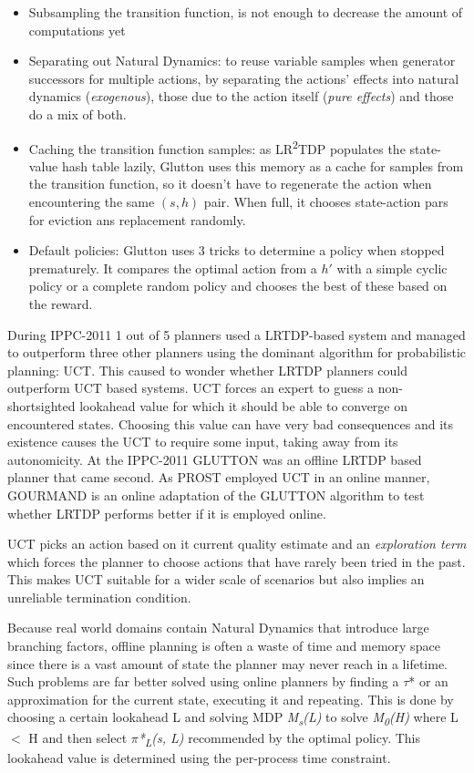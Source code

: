 \documentclass[runningheads,a4paper]{llncs}
\begin{document}
\begin{itemize}
	\item Subsampling the transition function, is not enough to decrease the amount of computations yet
	\item Separating out Natural Dynamics: to reuse variable samples when generator successors for multiple actions, by separating the actions' effects into natural dynamics (\emph{exogenous}), those due to the action itself (\emph{pure effects}) and those do a mix of both.
	\item Caching the transition function samples: as LR\textsuperscript{2}TDP populates the state-value hash table lazily, Glutton uses  this memory as a cache for samples from the transition function, so it doesn't have to regenerate the action when encountering the same $(s,h)$ pair. When full, it chooses state-action pars for eviction ans replacement randomly.
	\item Default policies: Glutton uses 3 tricks to determine a policy when stopped prematurely. It compares the optimal action from a $h'$ with a simple cyclic policy or a complete random policy and chooses the best of these based on the reward.
\end{itemize}
During IPPC-2011 1 out of 5 planners used a LRTDP-based system and managed to outperform three other planners using the dominant algorithm for probabilistic planning: UCT. This caused to wonder whether LRTDP planners could outperform UCT based systems.  UCT forces an expert to guess a non-shortsighted lookahead value for which it should be able to converge on encountered states. Choosing this value can have very bad consequences and its existence causes the UCT to require some input, taking away from its autonomicity. At the IPPC-2011 GLUTTON was an offline LRTDP based planner that came second. As PROST employed UCT in an online manner, GOURMAND is an online adaptation of the GLUTTON algorithm to test whether LRTDP performs better if it is employed online.

UCT picks an action based on it current quality estimate and an \emph{exploration term} which forces the planner to choose actions that have rarely been tried in the past. This makes UCT suitable for a wider scale of scenarios but also implies an unreliable termination condition.

Because real world domains contain Natural Dynamics that introduce large branching factors, offline planning is often a waste of time and memory space since there is a vast amount of state the planner may never reach in a lifetime. Such problems are far better solved using online planners by finding a $\tau$* or an approximation for the current state, executing it and repeating. This is done by choosing a certain lookahead  L and solving MDP \emph{M\textsubscript{s}(L)} to solve \emph{M\textsubscript{0}(H)} where L $<$ H and then select \emph{$\pi$*\textsubscript{L}(s, L)} recommended by the optimal policy. This lookahead value is determined using the per-process time constraint.
\end{document}
